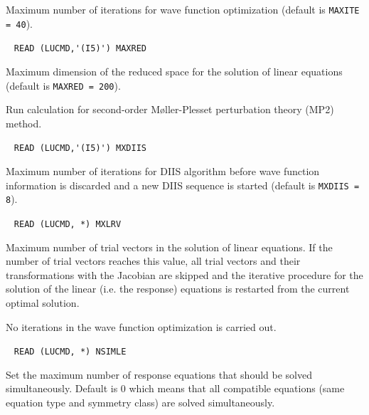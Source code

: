 \begin{description}
  Maximum number of iterations for wave function optimization 
  (default is \verb+MAXITE = 40+).
 
\item[\Key{MAXRED}] \verb| |\newline 
  \verb|READ (LUCMD,'(I5)') MAXRED|

  Maximum dimension of the reduced space for the 
  solution of linear equations (default is \verb+MAXRED = 200+).
 
%
%
\item[\Key{MP2}]    
Run calculation for second-order M{\o}ller-Plesset perturbation theory
(MP2) method.

\item[\Key{MXDIIS}] \verb| |\newline
  \verb|READ (LUCMD,'(I5)') MXDIIS|

  Maximum number of iterations for DIIS algorithm
  before wave function information is discarded and a new DIIS 
  sequence is started
  (default is \verb+MXDIIS = 8+).
 
\item[\Key{MXLRV}] \verb| |\newline
  \verb|READ (LUCMD, *) MXLRV|

  Maximum number of trial vectors in the solution of 
  linear equations. If the number of trial vectors reaches this
  value, all trial vectors and their transformations with the
  Jacobian are skipped and the iterative procedure for the solution of the
  linear (i.e. the response) equations is restarted from the current 
  optimal solution. 
 
\item[\Key{NOCCIT}]
   No iterations in the wave function optimization is carried out.

\item[\Key{NSIMLE}] \verb| |\newline
  \verb|READ (LUCMD, *) NSIMLE|

  Set the maximum number of response equations that should be 
  solved simultaneously. Default is 0 which means that all
  compatible equations (same equation type and symmetry class) 
  are solved simultaneously.
 

\end{description}
